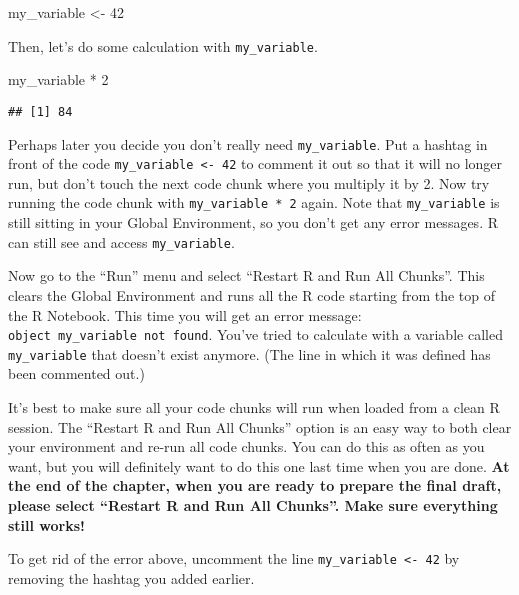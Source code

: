 \documentclass[
]{book}
\newenvironment{Shaded}{\begin{snugshade}}{\end{snugshade}}
\newcommand{\DecValTok}[1]{\textcolor[rgb]{0.00,0.00,0.81}{#1}}
\newcommand{\NormalTok}[1]{#1}
\newcommand{\OtherTok}[1]{\textcolor[rgb]{0.56,0.35,0.01}{#1}}
\newcommand{\SpecialCharTok}[1]{\textcolor[rgb]{0.00,0.00,0.00}{#1}}
\begin{document}
\begin{Shaded}
\begin{Highlighting}[]
\NormalTok{my\_variable }\OtherTok{\textless{}{-}} \DecValTok{42}
\end{Highlighting}
\end{Shaded}

Then, let's do some calculation with \texttt{my\_variable}.

\begin{Shaded}
\begin{Highlighting}[]
\NormalTok{my\_variable }\SpecialCharTok{*} \DecValTok{2}
\end{Highlighting}
\end{Shaded}

\begin{verbatim}
## [1] 84
\end{verbatim}

Perhaps later you decide you don't really need \texttt{my\_variable}. Put a hashtag in front of the code \texttt{my\_variable\ \textless{}-\ 42} to comment it out so that it will no longer run, but don't touch the next code chunk where you multiply it by 2. Now try running the code chunk with \texttt{my\_variable\ *\ 2} again. Note that \texttt{my\_variable} is still sitting in your Global Environment, so you don't get any error messages. R can still see and access \texttt{my\_variable}.

Now go to the ``Run'' menu and select ``Restart R and Run All Chunks''. This clears the Global Environment and runs all the R code starting from the top of the R Notebook. This time you will get an error message: \texttt{object\ \textquotesingle{}my\_variable\textquotesingle{}\ not\ found}. You've tried to calculate with a variable called \texttt{my\_variable} that doesn't exist anymore. (The line in which it was defined has been commented out.)

It's best to make sure all your code chunks will run when loaded from a clean R session. The ``Restart R and Run All Chunks'' option is an easy way to both clear your environment and re-run all code chunks. You can do this as often as you want, but you will definitely want to do this one last time when you are done. \textbf{At the end of the chapter, when you are ready to prepare the final draft, please select ``Restart R and Run All Chunks''. Make sure everything still works!}

To get rid of the error above, uncomment the line \texttt{my\_variable\ \textless{}-\ 42} by removing the hashtag you added earlier.
\end{document}
